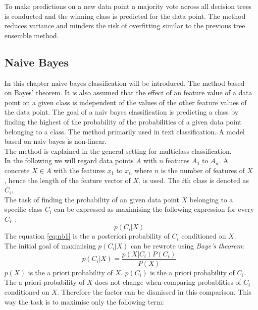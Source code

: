 To make predictions on a new data point  a majority vote across all decision trees is conducted and the winning class is predicted for the data point. The method reduces variance and minders the risk of overfitting similar to the previous tree ensemble method.

\subsection{Naive Bayes}
In this chapter naive bayes classification will be introduced. The method based on Bayes’ theorem. It is also assumed that the effect of an feature value of a data point on a given class is independent of the values of the other feature values of the data point. The goal of a naiv bayes classification is predicting a class by finding the highest of the probability of the probabilities of a given data point belonging to a class. The method primarily used in text classification.
A model based on naiv bayes is non-linear.
\\
The method is explained in the general setting for multiclass classification.
\\
In the following we will regard data points $A$ with $n$ features $A_1$ to $A_n$. A concrete $X \in A$ with the features $x_1$ to $x_n$ where $n$ is the number of features of $X$, hence the length of the feature vector of $X$, is used. The $i$th class is denoted as $C_i$.\\
The task of finding the probability of an given data point $X$ belonging to a specific class $C_i$ can be expressed as maximising the following expression for every $C_I$ :
\begin{equation} \label{eq:nb1}
 p(C_i|X)
\end{equation}
The equation \ref{eq:nb1} is the a posteriori probability of $C_i$ conditioned on $X$.
\\
The initial goal of maximising $p(C_i|X)$ can be rewrote using \emph{Baye's theorem}:
\begin{equation} \label{eq:nb2}
p(C_i|X)=\frac{p(X|C_i) P(C_i)}{P(X)}
\end{equation}
$p(X)$ is the a priori probability of $X$. $p(C_i)$ is the a priori probability of $C_i$.
\\
The a priori probability of $X$ does not change when comparing probablities of $C_i$ conditioned on $X$. Therefore the factor can be dismissed in this comparison. This way the task is to maximise only the following term:
